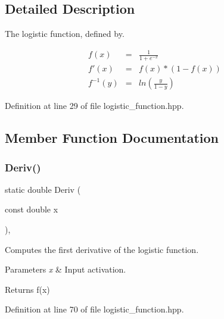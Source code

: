 \subsection{Detailed Description}
The logistic function, defined by. 

\begin{eqnarray*} f(x) &=& \frac{1}{1 + e^{-x}} \\ f'(x) &=& f(x) * (1 - f(x)) \\ f^{-1}(y) &=& ln(\frac{y}{1-y}) \end{eqnarray*} 

Definition at line 29 of file logistic\+\_\+function.\+hpp.



\subsection{Member Function Documentation}
\mbox{\label{classmlpack_1_1ann_1_1LogisticFunction_acd77fae79f7ba1f4b9a21e07a261e537}} 
\subsubsection{Deriv()\hspace{0.1cm}{\footnotesize\ttfamily [1/2]}}
{\footnotesize\ttfamily static double Deriv (\begin{DoxyParamCaption}\item[{const double}]{x }\end{DoxyParamCaption})\hspace{0.3cm}{\ttfamily [inline]}, {\ttfamily [static]}}



Computes the first derivative of the logistic function. 


\begin{DoxyParams}{Parameters}
{\em x} & Input activation. \\
\hline
\end{DoxyParams}
\begin{DoxyReturn}{Returns}
f\textquotesingle{}(x) 
\end{DoxyReturn}


Definition at line 70 of file logistic\+\_\+function.\+hpp.

\mbox{\label{classmlpack_1_1ann_1_1LogisticFunction_ad442502c34b67303b74c735641dab790}} 
